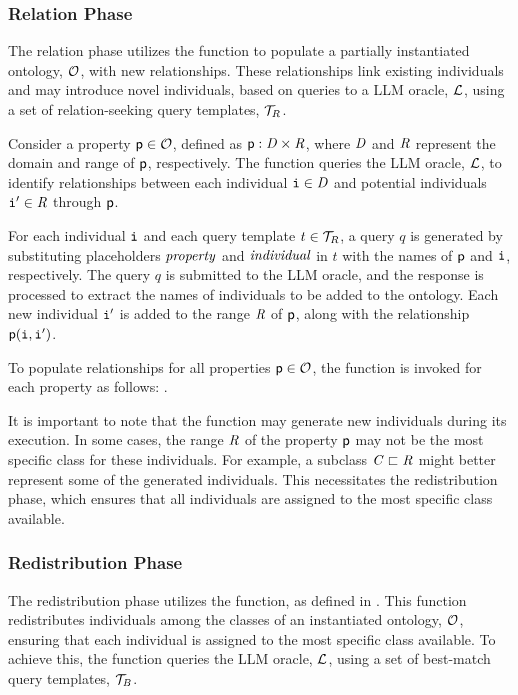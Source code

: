 \subsubsection{Relation Phase}
\label{subsubsec:relation-phase}
%

%
The relation phase utilizes the \relate{} function to populate a partially instantiated ontology, \(\relset{O}\), with new relationships.
%
These relationships link existing individuals and may introduce novel individuals, based on queries to a \gls{LLM} oracle, \(\relset{L}\), using a set of relation-seeking query templates, \(\relset{T}_{R}\).

%
Consider a property \(\relation{p} \in \relset{O}\), defined as \(\relation{p} : \concept{D} \times \concept{R}\), where \(\concept{D}\) and \(\concept{R}\) represent the domain and range of \(\relation{p}\), respectively.
%
The function queries the \gls{LLM} oracle, \(\relset{L}\), to identify relationships between each individual \(\instance{i} \in \concept{D}\) and potential individuals \(\instance{i}' \in \concept{R}\) through \(\relation{p}\).

%
For each individual \(\instance{i}\) and each query template \(t \in \relset{T}_{R}\), a query \(q\) is generated by substituting placeholders \(\mathit{property}\) and \(\mathit{individual}\) in \(t\) with the names of \(\relation{p}\) and \(\instance{i}\), respectively.
%
The query \(q\) is submitted to the \gls{LLM} oracle, and the response is processed to extract the names of individuals to be added to the ontology.
%
Each new individual \(\instance{i}'\) is added to the range \(\concept{R}\) of \(\relation{p}\), along with the relationship \(\relation{p}(\instance{i}, \instance{i}')\).

%
To populate relationships for all properties \(\relation{p} \in \relset{O}\), the function is invoked for each property as follows:
%
.

%
It is important to note that the \relate{} function may generate new individuals during its execution.
%
In some cases, the range \(\concept{R}\) of the property \(\relation{p}\) may not be the most specific class for these individuals.
%
For example, a subclass \(\concept{C} \sqsubset \concept{R}\) might better represent some of the generated individuals.
%
This necessitates the redistribution phase, which ensures that all individuals are assigned to the most specific class available.


\subsubsection{Redistribution Phase}
\label{subsubsec:redistribution-phase}
%

%
The redistribution phase utilizes the \redistribute{} function, as defined in .
%
This function redistributes individuals among the classes of an instantiated ontology, \(\relset{O}\), ensuring that each individual is assigned to the most specific class available.
%
To achieve this, the function queries the \gls{LLM} oracle, \(\relset{L}\), using a set of best-match query templates, \(\relset{T}_{B}\).

